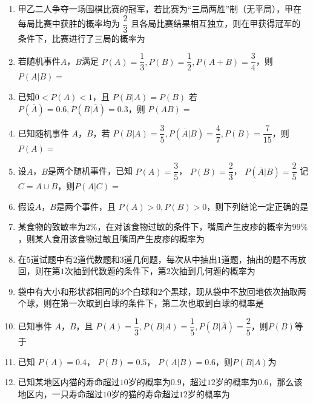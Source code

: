 \begin{enumerate}

\item 甲乙二人争夺一场围棋比赛的冠军，若比赛为“三局两胜”制（无平局），甲在每局比赛中获胜的概率均为 $\dfrac{2}{3}$ 且各局比赛结果相互独立，则在甲获得冠军的条件下，比赛进行了三局的概率为

\item 若随机事件$A$，$B$满足 $P(A)=\dfrac{1}{3},P(B)=\dfrac{1}{2},P(A+B)=\dfrac{3}{4}$，则 $P(A|B)=$

\item 已知$0<P(A)<1$，且 $P(B|A)=P(B)$ 若 $P(\overline{A})=0.6,P(B|\overline{A})=0.3$，则 $P(AB)=$

\item 已知随机事件 $A$，$B$，若 $P(B|A)=\dfrac{3}{5},P(\overline{A}|B)=\dfrac{4}{7},P(B)=\dfrac{7}{15}$，则$P(A)=$

\item 设$A$，$B$是两个随机事件，已知 $P(A)=\dfrac{3}{5}$， $P(B)=\dfrac{2}{3}$， $P(\overline{A}|B)=\dfrac{2}{5}$ 记 $C=A\cup B$，则$P(A|C)=$

\item 假设$A$，$B$是两个事件，且 $P(A)>0,P(B)>0$，则下列结论一定正确的是

\item 某食物的致敏率为$2\%$，在对该食物过敏的条件下，嘴周产生皮疹的概率为$99\%$，则某人食用该食物过敏且嘴周产生皮疹的概率为

\item 在$5$道试题中有$2$道代数题和$3$道几何题，每次从中抽出$1$道题，抽出的题不再放回，则在第$1$次抽到代数题的条件下，第$2$次抽到几何题的概率为

\item 袋中有大小和形状都相同的$3$个白球和$2$个黑球，现从袋中不放回地依次抽取两个球，则在第一次取到白球的条件下，第二次也取到白球的概率是

\item 已知事件 $A$，$B$，且 $P(A)=\dfrac{1}{3},P(B|A)=\dfrac{1}{5},P(B|\overline{A})=\dfrac{2}{5}$，则$P(B)$等于

\item 已知 $P(A)=0.4$， $P(B)=0.5$， $P(A|B)=0.6$，则$P(B|A)$为

\item 已知某地区内猫的寿命超过$10$岁的概率为$0.9$，超过$12$岁的概率为$0.6$，那么该地区内，一只寿命超过$10$岁的猫的寿命超过$12$岁的概率为


\end{enumerate}
